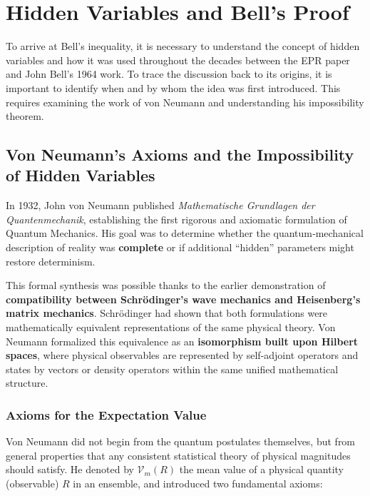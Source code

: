 
\section{Hidden Variables and Bell's Proof}
\label{sec:Hidden Variables}

To arrive at Bell’s inequality, it is necessary to understand the concept of hidden variables and how it was used throughout the decades between the EPR paper and John Bell’s 1964 work. To trace the discussion back to its origins, it is important to identify when and by whom the idea was first introduced. This requires examining the work of von Neumann and understanding his impossibility theorem.

\subsection{Von Neumann's Axioms and the Impossibility of Hidden Variables}

In 1932, John von Neumann published \textit{Mathematische Grundlagen der Quantenmechanik}, establishing the first rigorous and axiomatic formulation of Quantum Mechanics. His goal was to determine whether the quantum‐mechanical description of reality was \textbf{complete} or if additional ``hidden'' parameters might restore determinism. 

This formal synthesis was possible thanks to the earlier demonstration of \textbf{compatibility between Schrödinger’s wave mechanics and Heisenberg’s matrix mechanics}. Schrödinger had shown that both formulations were mathematically equivalent representations of the same physical theory. Von Neumann formalized this equivalence as an \textbf{isomorphism built upon Hilbert spaces}, where physical observables are represented by self-adjoint operators and states by vectors or density operators within the same unified mathematical structure.

\vspace{0.3cm}

\subsubsection*{Axioms for the Expectation Value}

Von Neumann did not begin from the quantum postulates themselves, but from general properties that any consistent statistical theory of physical magnitudes should satisfy.  
He denoted by $\mathcal{V}_m(R)$ the mean value of a physical quantity (observable) $R$ in an ensemble, and introduced two fundamental axioms:

